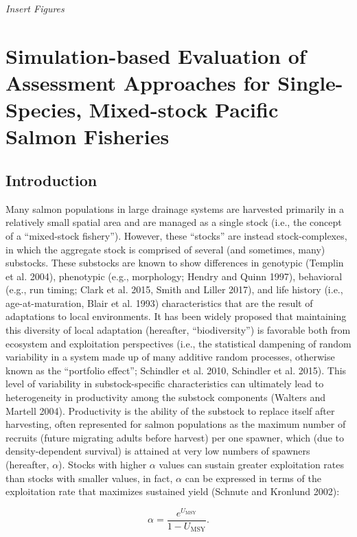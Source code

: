 \documentclass[12pt,]{book}
\theoremstyle{definition}
\theoremstyle{definition}
\theoremstyle{definition}
\theoremstyle{remark}
\begin{document}
\emph{Insert Figures}

\chapter{Simulation-based Evaluation of Assessment Approaches for
Single-Species, Mixed-stock Pacific Salmon Fisheries}\label{ch4}

\section{Introduction}\label{introduction-2}

\noindent
Many salmon populations in large drainage systems are harvested
primarily in a relatively small spatial area and are managed as a single
stock (i.e., the concept of a ``mixed-stock fishery''). However, these
``stocks'' are instead stock-complexes, in which the aggregate stock is
comprised of several (and sometimes, many) substocks. These substocks
are known to show differences in genotypic (Templin et al. 2004),
phenotypic (e.g., morphology; Hendry and Quinn 1997), behavioral (e.g.,
run timing; Clark et al. 2015, Smith and Liller 2017), and life history
(i.e., age-at-maturation, Blair et al. 1993) characteristics that are
the result of adaptations to local environments. It has been widely
proposed that maintaining this diversity of local adaptation (hereafter,
``biodiversity'') is favorable both from ecosystem and exploitation
perspectives (i.e., the statistical dampening of random variability in a
system made up of many additive random processes, otherwise known as the
``portfolio effect''; Schindler et al. 2010, Schindler et al. 2015).
This level of variability in substock-specific characteristics can
ultimately lead to heterogeneity in productivity among the substock
components (Walters and Martell 2004). Productivity is the ability of
the substock to replace itself after harvesting, often represented for
salmon populations as the maximum number of recruits (future migrating
adults before harvest) per one spawner, which (due to density-dependent
survival) is attained at very low numbers of spawners (hereafter,
\(\alpha\)). Stocks with higher \(\alpha\) values can sustain greater
exploitation rates than stocks with smaller values, in fact, \(\alpha\)
can be expressed in terms of the exploitation rate that maximizes
sustained yield (Schnute and Kronlund 2002):

\begin{equation}
  \alpha=\frac{e^{U_{\text{MSY}}}}{1 - U_{\text{MSY}}}.
  \label{eq:umsy-to-alpha}
\end{equation}
\end{document}
